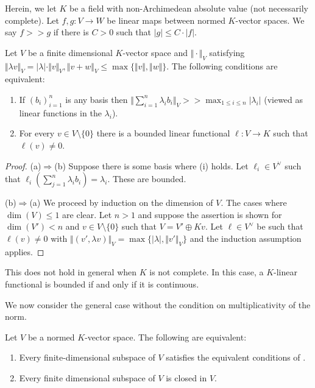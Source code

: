 Herein, we let $K$ be a field with non-Archimedean absolute value (not necessarily complete). Let $f,g\colon V\to W$ be linear maps between normed
$K$-vector spaces. We say $f>>g$ if there is $C>0$ such that $|g|\leq C\cdot|f|$. 
\begin{proposition}\label{prop: equivalent conditions on vector spaces}
    Let $V$ be a finite dimensional $K$-vector space and $\Vert\cdot\Vert_{V}$ satisfying $\Vert \lambda v\Vert_{V}=|\lambda|\cdot\Vert v\Vert_{V}, \Vert v+w\Vert_{V}\leq\max\{\Vert v\Vert,\Vert w\Vert\}$. The following conditions are equivalent: 
    \begin{enumerate}[label=(\roman*)]
        \item If $(b_{i})_{i=1}^{n}$ is any basis then $\Vert\sum_{i=1}^{n}\lambda_{i}b_{i}\Vert_{V}>>\max_{1\leq i\leq n}|\lambda_{i}|$ (viewed as linear functions in the $\lambda_i$). 
        \item For every $v\in V\setminus\{0\}$ there is a bounded linear functional $\ell:V\to K$ such that $\ell(v)\neq0$. 
    \end{enumerate}
\end{proposition}
\begin{proof}
    (a)$\Rightarrow$(b) Suppose there is some basis where (i) holds. Let $\ell_{i}\in V^{\vee}$ such that $\ell_{i}\left(\sum_{j=1}^{n}\lambda_{i}b_{i}\right)=\lambda_{i}$. These are bounded. 

    (b)$\Rightarrow$(a) We proceed by induction on the dimension of $V$. The cases where $\dim(V)\leq 1$ are clear. Let $n>1$ and suppose the assertion is shown for $\dim(V')<n$ and $v\in V\setminus\{0\}$ such that $V=V'\oplus Kv$. Let $\ell\in V^{\vee}$ be such that $\ell(v)\neq0$ with $\Vert (v',\lambda v)\Vert_{V}=\max\{|\lambda|,\Vert v'\Vert_{V}\}$ and the induction assumption applies. 
\end{proof}
\begin{remark}
    This does not hold in general when $K$ is not complete. In this case, a $K$-linear functional is bounded if and only if it is continuous. 
\end{remark}
We now consider the general case without the condition on multiplicativity of the norm. 
\begin{proposition}\label{prop: finite subspace is closed}
    Let $V$ be a normed $K$-vector space. The following are equivalent:
    \begin{enumerate}[label=(\alph*)]
        \item Every finite-dimensional subspace of $V$ satisfies the equivalent conditions of . 
        \item Every finite dimensional subspace of $V$ is closed in $V$. 
    \end{enumerate}
\end{proposition}
